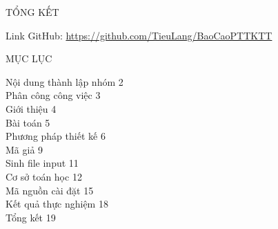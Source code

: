\documentclass[10pt,a4paper]{article}
\begin{document}
\begin{center}
    \fontsize{30}{30}\selectfont
    TỔNG KẾT
\end{center}
\fontsize{14}{20}\selectfont
Link GitHub: \url{https://github.com/TieuLang/BaoCaoPTTKTT}\\
\vspace{1 cm}
\begin{center}
    \fontsize{30}{30}\selectfont
    MỤC LỤC
\end{center}
\fontsize{14}{20}\selectfont
\begin{flushleft}
Nội dung thành lập nhóm \hspace{10.05 cm} 2\\
Phân công công việc \hspace{11.2 cm} 3\\
Giới thiệu \hspace{13.6 cm}4\\
Bài toán \hspace{13.9cm}5\\
Phương pháp thiết kế \hspace{11.15 cm}6\\
Mã giả \hspace{14.3 cm}9\\
Sinh file input \hspace{12.4cm} 11\\
Cơ sở toán học \hspace{12.25 cm} 12\\
Mã nguồn cài đặt \hspace{11.7 cm} 15\\
Kết quả thực nghiệm \hspace{10.95 cm } 18\\
Tổng kết \hspace{13.6 cm} 19\\
\end{flushleft}
\end{document}
